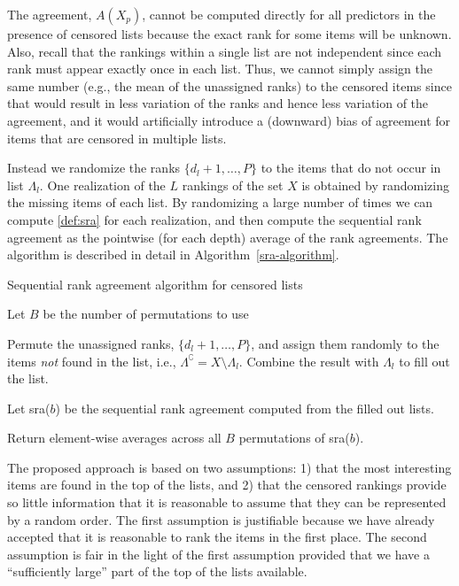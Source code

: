 \documentclass[12pt,a4paper]{article}
\theoremstyle{plain}
\begin{document}
The agreement, $A(X_p)$, cannot be computed directly for all
predictors in the presence of censored lists because the exact rank
for some items will be unknown. Also, recall that the rankings within
a single list are not independent since each rank must appear exactly
once in each list. Thus, we cannot simply assign the same number
(e.g., the mean of the unassigned ranks) to the censored items since
that would result in less variation of the ranks and hence less
variation of the agreement, and it would artificially introduce a
(downward) bias of agreement for items that are censored in multiple
lists.

Instead we randomize the ranks $\{d_{l}+1,\dots,P\}$ to the items that
do not occur in list $\Lambda_l$. One realization of the $L$ rankings
of the set $X$ is obtained by randomizing the missing items of each
list. By randomizing a large number of times we can compute
\eqref{def:sra} for each realization, and then compute the sequential
rank agreement as the pointwise (for each depth) average of the rank
agreements. The algorithm is described in detail in
Algorithm~\ref{sra-algorithm}.

\begin{algorithm}
\caption{Sequential rank agreement algorithm for censored lists}
\label{sra-algorithm}
\begin{algorithmic}[1]
   \State Let $B$ be the number
  of permutations to use  
  \State \parbox[t]{\dimexpr\linewidth-\algorithmicindent-1.7cm}{Permute
    the unassigned ranks, $\{d_l+1, \ldots, P\}$, and assign them
    randomly to the items \emph{not} found in the list, i.e.,
    $\Lambda^\complement=X\setminus\Lambda_l$. Combine the
    result with $\Lambda_l$ to fill out the list.}
\EndFor
\State \parbox[t]{\dimexpr\linewidth-\algorithmicindent-1cm}{Let sra($b$) be the sequential rank agreement computed from the
filled out lists.}
\EndFor
\State Return element-wise averages across all $B$ permutations of sra($b$).
\EndProcedure
\end{algorithmic}
\end{algorithm}

The proposed approach is based on two assumptions: 1) that the most
interesting items are found in the top of the lists, and 2) that the
censored rankings provide so little information that it is reasonable
to assume that they can be represented by a random order. The first
assumption is justifiable because we have already accepted that it is
reasonable to rank the items in the first place. The second assumption
is fair in the light of the first assumption provided that we have a
``sufficiently large'' part of the top of the lists available.
\end{document}
